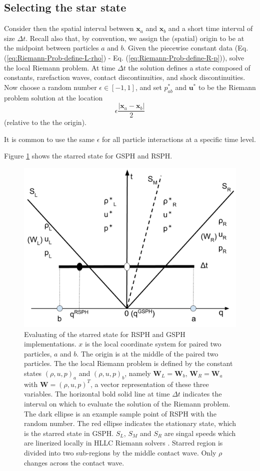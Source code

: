 \documentclass[review]{elsarticle}
\begin{document}
\subsection{Selecting the star state} \label{sec:Picking-up-single-state}
Consider then the spatial interval between $\textbf{x}_{a}$ and $\textbf{x}_{ b}$ and a short time interval of size $\Delta t$. Recall also that, by convention, we assign the (spatial) origin to be at the midpoint between particles $a$ and $b$.
Given the piecewise constant data (Eq. (\ref{eq:Riemann-Prob-define-L-rho}) - Eq. (\ref{eq:Riemann-Prob-define-R-p})), solve the local Riemann problem. At time $\Delta t$ the solution defines a state composed of constants, rarefaction waves, contact discontinuities, and shock discontinuities. 
Now choose a random number $\epsilon \in [-1,1]$, and set $p_{a b}^{\ast}$ and $\textbf{u}^{\ast}$ to be the Riemann problem solution at the location 
$$
\epsilon \frac{|\textbf{x}_{a} - \textbf{x}_{ b}|}{2}
$$
(relative to the the origin).

It is common to use the same $\epsilon$ for all particle interactions at a specific time level.

Figure \ref{fig:pick-up-state-GSPH-RSPH} shows the starred state for GSPH and RSPH.
\begin{figure}[H]
    \center
	\includegraphics[width=0.5 \textwidth]{./Figures/RSPH-GSPH}
    \caption{Evaluating of the starred state for  RSPH and GSPH implementations. $x$ is the local coordinate system for paired two particles, $a$ and $b$. The origin is at the middle of the paired two particles.
The the local Riemann problem is defined by the constant states $(\rho, u, p)_a$ and $(\rho, u,p)_b$, namely $\textbf{W}_L = \textbf{W}_b$, $\textbf{W}_R = \textbf{W}_a$ with $\textbf{W} = (\rho, u,p)^T $, a vector representation of these three variables. The horizontal bold solid line at time $\Delta t$ indicates the interval on which to evaluate the solution of the Riemann problem. The dark ellipse is an example sample point of RSPH with the random number. The red ellipse indicates the stationary state, which is the starred state in GSPH. $S_L$, $S_M$ and $S_R$ are singal speeds which are linerized locally in HLLC Riemann solvers \citep{puri2014approximate}. Starred region is divided into two sub-regions by the middle contact wave. Only $\rho$ changes across the contact wave. }
    \label{fig:pick-up-state-GSPH-RSPH}
\end{figure}
\end{document}
